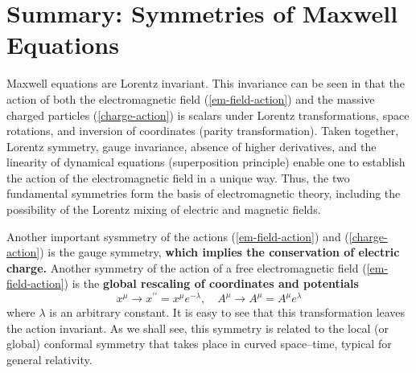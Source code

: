 \section{Summary: Symmetries of Maxwell Equations}
Maxwell equations are Lorentz invariant. This invariance can be seen in that the action of both the electromagnetic field (\ref{em-field-action}) and the massive charged particles (\ref{charge-action}) is scalars under Lorentz transformations, space rotations, and inversion of coordinates (parity transformation). Taken together, Lorentz symmetry, gauge invariance, absence of higher derivatives, and the linearity of dynamical equations (superposition principle) enable one to establish the action of the electromagnetic field in a unique way. Thus, the two fundamental symmetries form the basis of electromagnetic theory, including the possibility of the Lorentz mixing of electric and magnetic fields.

Another important sysmmetry of the actions (\ref{em-field-action}) and (\ref{charge-action}) is the gauge symmetry, \textbf{which implies the conservation of electric charge.} Another symmetry of the action of a free electromagnetic field (\ref{em-field-action}) is the \textbf{global rescaling of coordinates and potentials}
\begin{equation}
x^{\mu} \longrightarrow x^{\prime \prime}=x^{\mu} e^{-\lambda}, \quad A^{\mu} \longrightarrow A^{\mu}=A^{\mu} e^{\lambda}
\end{equation}
where $\lambda$ is an arbitrary constant. It is easy to see that this transformation leaves the action invariant. As we shall see, this symmetry is related to the local (or global) conformal symmetry that takes place in curved space–time, typical for general relativity.

